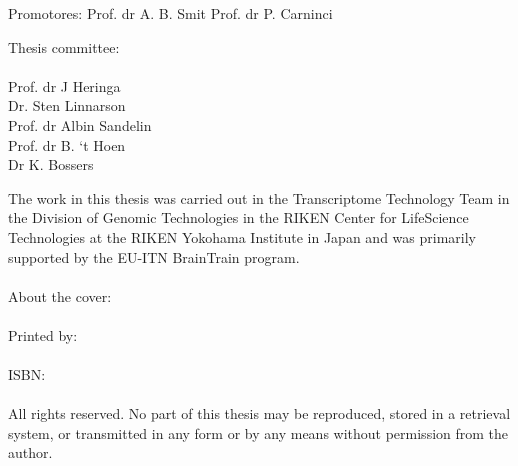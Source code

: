 \fontsize{13}{1.5em}\selectfont

\noindent
Promotores:
\tabto{3cm} Prof. dr A. B. Smit
\tabto{3cm} Prof. dr P. Carninci

\newpage

{  
   \setlength{\parindent}{0cm}
   Thesis committee:
   \\
   \\
   Prof. dr J Heringa \\
   Dr. Sten Linnarson \\
   Prof. dr Albin Sandelin \\
   Prof. dr B. `t Hoen \\
   Dr K. Bossers \\
}

\newpage

\normalsize
{  
   \setlength{\parindent}{0cm}
   The work in this thesis was carried out in the Transcriptome Technology Team in the Division of Genomic Technologies in the RIKEN Center for LifeScience Technologies at the RIKEN Yokohama Institute in Japan and was primarily supported by the EU-ITN BrainTrain program.
   \\
   \\
   About the cover:
   \\
   \\
   Printed by:
   \\
   \\
   ISBN:
   \\
   \\
   All rights reserved. No part of this thesis may be reproduced, stored in a retrieval system, or transmitted in any form or by any means without permission from the author.
}
